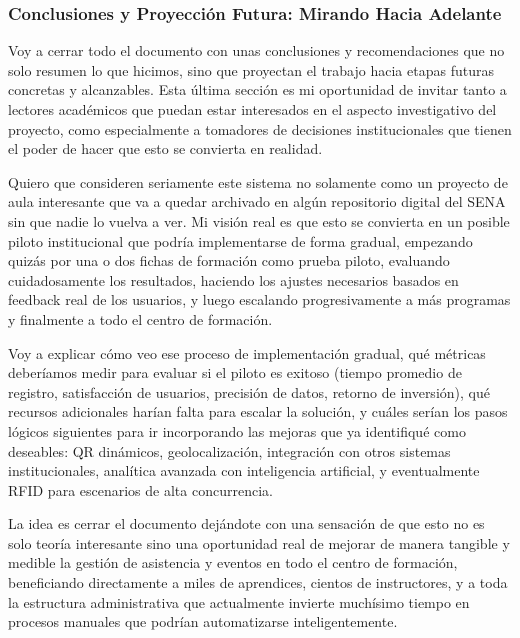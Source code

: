 \subsubsection*{Conclusiones y Proyección Futura: Mirando Hacia Adelante}

Voy a cerrar todo el documento con unas conclusiones y recomendaciones que no solo resumen lo que hicimos, sino que proyectan el trabajo hacia etapas futuras concretas y alcanzables. Esta última sección es mi oportunidad de invitar tanto a lectores académicos que puedan estar interesados en el aspecto investigativo del proyecto, como especialmente a tomadores de decisiones institucionales que tienen el poder de hacer que esto se convierta en realidad.

Quiero que consideren seriamente este sistema no solamente como un proyecto de aula interesante que va a quedar archivado en algún repositorio digital del SENA sin que nadie lo vuelva a ver. Mi visión real es que esto se convierta en un posible piloto institucional que podría implementarse de forma gradual, empezando quizás por una o dos fichas de formación como prueba piloto, evaluando cuidadosamente los resultados, haciendo los ajustes necesarios basados en feedback real de los usuarios, y luego escalando progresivamente a más programas y finalmente a todo el centro de formación.

Voy a explicar cómo veo ese proceso de implementación gradual, qué métricas deberíamos medir para evaluar si el piloto es exitoso (tiempo promedio de registro, satisfacción de usuarios, precisión de datos, retorno de inversión), qué recursos adicionales harían falta para escalar la solución, y cuáles serían los pasos lógicos siguientes para ir incorporando las mejoras que ya identifiqué como deseables: QR dinámicos, geolocalización, integración con otros sistemas institucionales, analítica avanzada con inteligencia artificial, y eventualmente RFID para escenarios de alta concurrencia.

La idea es cerrar el documento dejándote con una sensación de que esto no es solo teoría interesante sino una oportunidad real de mejorar de manera tangible y medible la gestión de asistencia y eventos en todo el centro de formación, beneficiando directamente a miles de aprendices, cientos de instructores, y a toda la estructura administrativa que actualmente invierte muchísimo tiempo en procesos manuales que podrían automatizarse inteligentemente.